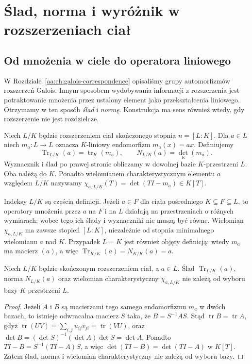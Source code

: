\chapter{Ślad, norma i wyróżnik w rozszerzeniach ciał}
\label{aa:ch:trace-norm-discriminant}
\label{aa:ch:trace-norm}

\section{Od mnożenia w ciele do operatora liniowego}
W Rozdziale~\ref{aa:ch:galois-correspondence} opisaliśmy grupy automorfizmów
rozszerzeń Galois. Innym sposobem wydobywania informacji z rozszerzenia
jest potraktowanie mnożenia przez ustalony element jako przekształcenia
liniowego. Otrzymamy w ten sposób \emph{ślad} i \emph{normę}.
Konstrukcja ma sens również wtedy, gdy rozszerzenie nie jest rozdzielcze.

\begin{definicja}
\label{aa:def:field-trace-norm}
Niech $L/K$ będzie rozszerzeniem ciał skończonego stopnia $n=[L:K]$.
Dla $a\in L$ niech $m_a:L\to L$ oznacza $K$-liniowy endomorfizm
$m_a(x)=ax$. Definiujemy
\[
\operatorname{Tr}_{L/K}(a)=\operatorname{tr}_K(m_a),\qquad
N_{L/K}(a)=\det_K(m_a).
\]
Wyznacznik i ślad po prawej stronie obliczamy w dowolnej bazie
$K$-przestrzeni $L$. Oba należą do $K$.
Ponadto wielomianem charakterystycznym elementu $a$
względem $L/K$ nazywamy $\chi_{a,L/K}(T)=\det(TI-m_a)\in K[T]$.
\end{definicja}

\begin{uwaga}\label{aa:uw:trace-relative-extension}
Indeksy $L/K$ są częścią definicji. Jeżeli $a\in F$ dla ciała pośredniego
$K\subseteq F\subseteq L$, to operatory mnożenia przez $a$
na $F$ i na $L$ działają na przestrzeniach o różnych wymiarach;
wobec tego ich ślady i wyznaczniki nie muszą być równe.
Wielomian $\chi_{a,L/K}$ ma zawsze stopień $[L:K]$,
niezależnie od stopnia minimalnego wielomianu $a$ nad $K$.
Przypadek $L=K$ jest również objęty definicją:
wtedy $m_a$ ma macierz $(a)$, a więc
$\operatorname{Tr}_{K/K}(a)=N_{K/K}(a)=a$.
\end{uwaga}

\begin{lemat}
\label{aa:lem:trace-norm-basis}
Niech $L/K$ będzie skończonym rozszerzeniem ciał, a $a\in L$.
Ślad $\operatorname{Tr}_{L/K}(a)$, norma $N_{L/K}(a)$
oraz wielomian charakterystyczny $\chi_{a,L/K}$
nie zależą od wyboru bazy $K$-przestrzeni $L$.
\end{lemat}
\begin{proof}
Jeżeli $A$ i $B$ są macierzami tego samego endomorfizmu $m_a$
w dwóch bazach, to istnieje odwracalna macierz $S$ taka, że
$B=S^{-1}AS$. Stąd $\operatorname{tr}B=\operatorname{tr}A$,
gdyż $\operatorname{tr}(UV)=\sum_{i,j}u_{ij}v_{ji}=\operatorname{tr}(VU)$,
oraz $\det B=(\det S)^{-1}(\det A)\det S=\det A$.
Ponadto $TI-B=S^{-1}(TI-A)S$, a więc
$\det(TI-B)=\det(TI-A)$ w $K[T]$.
Zatem ślad, norma i wielomian charakterystyczny
nie zależą od wyboru bazy.
\end{proof}


